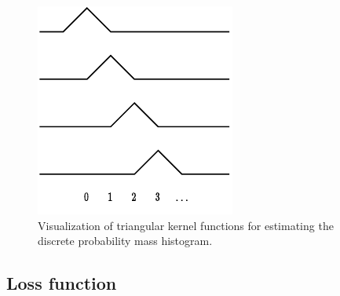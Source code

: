 \begin{figure}[tb]
  \centering
  \includegraphics[width=0.5\linewidth]{img/pdf_compression/hist-kernels.pdf}
  \caption[Kernel functions]{%
    Visualization of triangular kernel functions for estimating the discrete probability mass histogram.%
  }
  \label{fig:pdf/kernels}
\end{figure}




\subsection{Loss function}
\label{sec:pdf_compression/loss}

